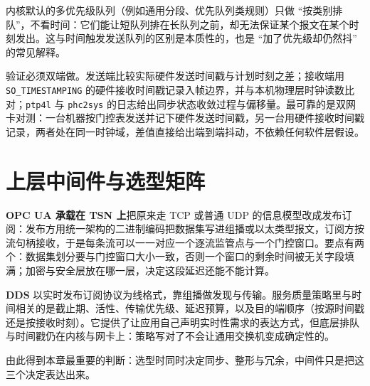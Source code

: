 \documentclass[12pt,a4paper,fontset=fandol]{ctexbook}
\newcommand{\Tp}[1]{\texttt{#1}}
\begin{document}
内核默认的多优先级队列（例如通用分段、优先队列类规则）只做 ``按类别排队''，不看时间：它们能让短队列排在长队列之前，却无法保证某个报文在某个时刻发出。这与时间触发发送队列的区别是本质性的，也是 ``加了优先级却仍然抖'' 的常见解释。

验证必须双端做。发送端比较实际硬件发送时间戳与计划时刻之差；接收端用 \Tp{SO\_TIMESTAMPING} 的硬件接收时间戳记录入帧边界，并与本机物理层时钟读数比对；\Tp{ptp4l} 与 \Tp{phc2sys} 的日志给出同步状态收敛过程与偏移量。最可靠的是双网卡对测：一台机器按门控表发送并记下硬件发送时间戳，另一台用硬件接收时间戳记录，两者处在同一时钟域，差值直接给出端到端抖动，不依赖任何软件层假设。

\section{上层中间件与选型矩阵}

\textbf{OPC UA 承载在 TSN 上}把原来走 TCP 或普通 UDP 的信息模型改成发布订阅：发布方用统一架构的二进制编码把数据集写进组播或以太类型报文，订阅方按流句柄接收，于是每条流可以一一对应一个逐流监管点与一个门控窗口。要点有两个：数据集划分要与门控窗口大小一致，否则一个窗口的剩余时间被无关字段填满；加密与安全层放在哪一层，决定这段延迟还能不能计算。

\textbf{DDS} 以实时发布订阅协议为线格式，靠组播做发现与传输。服务质量策略里与时间相关的是截止期、活性、传输优先级、延迟预算，以及目的端顺序（按源时间戳还是按接收时刻）。它提供了让应用自己声明实时性需求的表达方式，但底层排队与时间戳仍在内核与网卡上：策略写对了不会让通用交换机变成确定性的。

由此得到本章最重要的判断：选型时同时决定同步、整形与冗余，中间件只是把这三个决定表达出来。
\end{document}
